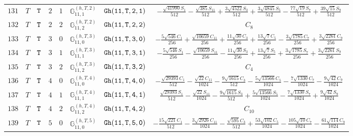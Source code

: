 \documentclass[fleqn,8pt]{jsarticle}
\begin{document}
\begin{table}[ht!]
\begin{center}
\begin{tabular}{cccccccc}
$ 131 $ & $ T $ & $ {\tt T} $ & $ 2 $ & $ 1 $ & $ \mathbb{G}_{11,1}^{(h,T,2)} $ & $ {\tt Gh(11,T,2,1)} $ & $ - \frac{\sqrt{41990} S_{1}}{512} - \frac{\sqrt{385} S_{11}}{512} + \frac{3 \sqrt{4522} S_{3}}{512} + \frac{3 \sqrt{4845} S_{5}}{512} - \frac{77 \sqrt{19} S_{7}}{512} + \frac{39 \sqrt{15} S_{9}}{512} $ \\
$ 132 $ & $ T $ & $ {\tt T} $ & $ 2 $ & $ 2 $ & $ \mathbb{G}_{11,2}^{(h,T,2)} $ & $ {\tt Gh(11,T,2,2)} $ & $ C_{8} $ \\
$ 133 $ & $ T $ & $ {\tt T} $ & $ 3 $ & $ 0 $ & $ \mathbb{G}_{11,0}^{(h,T,3)} $ & $ {\tt Gh(11,T,3,0)} $ & $ - \frac{5 \sqrt{546} C_{1}}{256} + \frac{\sqrt{10659} C_{11}}{256} + \frac{11 \sqrt{30} C_{3}}{256} + \frac{13 \sqrt{7} C_{5}}{256} - \frac{3 \sqrt{1785} C_{7}}{256} + \frac{3 \sqrt{2261} C_{9}}{256} $ \\
$ 134 $ & $ T $ & $ {\tt T} $ & $ 3 $ & $ 1 $ & $ \mathbb{G}_{11,1}^{(h,T,3)} $ & $ {\tt Gh(11,T,3,1)} $ & $ - \frac{5 \sqrt{546} S_{1}}{256} - \frac{\sqrt{10659} S_{11}}{256} - \frac{11 \sqrt{30} S_{3}}{256} + \frac{13 \sqrt{7} S_{5}}{256} + \frac{3 \sqrt{1785} S_{7}}{256} + \frac{3 \sqrt{2261} S_{9}}{256} $ \\
$ 135 $ & $ T $ & $ {\tt T} $ & $ 3 $ & $ 2 $ & $ \mathbb{G}_{11,2}^{(h,T,3)} $ & $ {\tt Gh(11,T,3,2)} $ & $ C_{4} $ \\
$ 136 $ & $ T $ & $ {\tt T} $ & $ 4 $ & $ 0 $ & $ \mathbb{G}_{11,0}^{(h,T,4)} $ & $ {\tt Gh(11,T,4,0)} $ & $ - \frac{\sqrt{29393} C_{1}}{512} - \frac{\sqrt{22} C_{11}}{1024} - \frac{9 \sqrt{1615} C_{3}}{512} - \frac{5 \sqrt{13566} C_{5}}{1024} - \frac{7 \sqrt{1330} C_{7}}{1024} - \frac{9 \sqrt{42} C_{9}}{1024} $ \\
$ 137 $ & $ T $ & $ {\tt T} $ & $ 4 $ & $ 1 $ & $ \mathbb{G}_{11,1}^{(h,T,4)} $ & $ {\tt Gh(11,T,4,1)} $ & $ \frac{\sqrt{29393} S_{1}}{512} - \frac{\sqrt{22} S_{11}}{1024} - \frac{9 \sqrt{1615} S_{3}}{512} + \frac{5 \sqrt{13566} S_{5}}{1024} - \frac{7 \sqrt{1330} S_{7}}{1024} + \frac{9 \sqrt{42} S_{9}}{1024} $ \\
$ 138 $ & $ T $ & $ {\tt T} $ & $ 4 $ & $ 2 $ & $ \mathbb{G}_{11,2}^{(h,T,4)} $ & $ {\tt Gh(11,T,4,2)} $ & $ C_{10} $ \\
$ 139 $ & $ T $ & $ {\tt T} $ & $ 5 $ & $ 0 $ & $ \mathbb{G}_{11,0}^{(h,T,5)} $ & $ {\tt Gh(11,T,5,0)} $ & $ - \frac{15 \sqrt{221} C_{1}}{512} - \frac{3 \sqrt{2926} C_{11}}{1024} - \frac{\sqrt{595} C_{3}}{512} + \frac{53 \sqrt{102} C_{5}}{1024} - \frac{105 \sqrt{10} C_{7}}{1024} - \frac{61 \sqrt{114} C_{9}}{1024} $ \\

\end{tabular}
\end{center}
\end{table}
\end{document}
